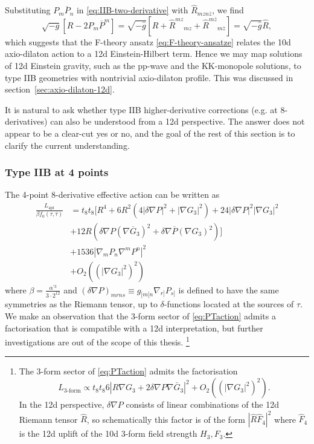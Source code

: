 Substituting $P_m\overline{P}_n$ in \eqref{eq:IIB-two-derivative} with $\widehat{R}_{mzn\overline{z}}$, we find
\begin{equation}
\sqrt{-g}[R - 2 P_m \overline{P}^m]
=\sqrt{-\widehat{g}}[R + \widehat{R}^{mz}{}_{mz} + \widehat{R}^{m\overline{z}}{}_{m\overline{z}}]
=\sqrt{-\widehat{g}} \widehat{R},
\label{eq:2-derivative-index-splitting}
\end{equation}
which suggests that the F-theory ansatz \eqref{eq:F-theory-ansatze} relates the 10d axio-dilaton action to a 12d Einstein-Hilbert term.
Hence we may map solutions of 12d Einstein gravity, such as the pp-wave and the KK-monopole solutions, to type IIB geometries with nontrivial axio-dilaton profile.
This was discussed in section~\ref{sec:axio-dilaton-12d}.

It is natural to ask whether type IIB higher-derivative corrections (e.g. at 8-derivatives) can also be understood from a 12d perspective.
The answer does not appear to be a clear-cut yes or no, and the goal of the rest of this section is to clarify the current understanding.

\subsubsection{Type IIB at 4 points}

The 4-point 8-derivative effective action can be written \cite{Liu:2025uqu,Minasian:2015bxa,Policastro:2008hg} as
\begin{equation}
\begin{aligned}
\frac{L_{\text{4pt}}}{\beta  f_{0}(\tau,\overline{\tau})}
&= t_{8}t_{8} \biggl[R^4+6R^{2}\left(4|\delta\nabla P|^{2}+|\nabla G_{3}|^{2}\right)+24|\delta \nabla P|^{2}|\nabla G_{3}|^{2}\\
&+12R\left(\delta \nabla P(\nabla\overline{G}_{3})^{2}+\delta \nabla \overline{P}(\nabla{G}_{3})^{2}\right)\biggr]\\
&+1536 |\nabla_m P_n \nabla^m P^n|^2\\
&+O_{2}\left((|\nabla G_{3}|^{2})^{2}\right)
\label{eq:PTaction}
\end{aligned}
\end{equation}
where $\beta = \frac{\alpha^{\prime 3}}{3 \cdot 2^{12}}$ and $(\delta \nabla P)_{mrns} \equiv g_{[m[n} \nabla_{r]} P_{s]}$ is defined to have the same symmetries as the Riemann tensor, up to $\delta$-functions located at the sources of $\tau$.
We make an observation that the 3-form sector of \eqref{eq:PTaction} admits a factorisation that is compatible with a 12d interpretation, but further investigations are out of the scope of this thesis.%
\footnote{
\label{footnote:3-form-factorisation}
The 3-form sector of \eqref{eq:PTaction} admits the factorisation
\begin{equation}
L_{\text{3-form}}
\propto
t_8t_8
6 |R \nabla G_3 + 2 \delta \nabla P \nabla \bar{G}_3|^2
+O_{2}\left((|\nabla G_{3}|^{2})^{2}\right).
\end{equation}
In the 12d perspective, $\delta \nabla P$ consists of linear combinations of the 12d Riemann tensor $\widehat{R}$, so schematically this factor is of the form $|\widehat{R} \widehat{F}_4|^2$ where $\widehat{F}_4$ is the 12d uplift of the 10d 3-form field strength $H_3, F_3$.
}

